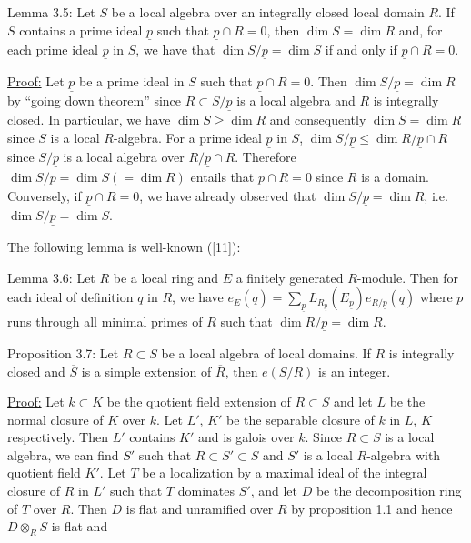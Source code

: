 Lemma 3.5: Let $S$ be a local algebra over an integrally closed local domain $R$. If $S$ contains a prime ideal $\underline p$ such that $\underline p\cap R=0$, then $\dim S=\dim R$ and, for each prime ideal $\underline p$ in $S$, we have that $\dim S/\underline p=\dim S$ if and only if $\underline p\cap R=0$.

\uline{Proof:} Let $\underline p$ be a prime ideal in $S$ such that $\underline p\cap R=0$. Then $\dim S/\underline p=\dim R$ by ``going down theorem'' since $R\subset S/\underline p$ is a local algebra and $R$ is integrally closed. In particular, we have $\dim S\geq\dim R$ and consequently $\dim S=\dim R$ since $S$ is a local $R$-algebra. For a prime ideal $\underline p$ in $S$, $\dim S/\underline p\leq\dim R/\underline p\cap R$ since $S/\underline p$ is a local algebra over $R/\underline p\cap R$. Therefore $\dim S/\underline p=\dim S(=\dim R)$ entails that $\underline p\cap R=0$ since $R$ is a domain. Conversely, if $\underline p\cap R=0$, we have already observed that $\dim S/\underline p=\dim R$, i.e. $\dim S/\underline p=\dim S$.
\margin{;}

The following lemma is well-known ([11]):

Lemma 3.6: Let $R$ be a local ring and $E$ a finitely generated $R$-module. Then for each ideal of definition $\underline q$ in $R$, we have $e_E(\underline q)=\sum_{\underline p}L_{R_{\underline p}}(E_{\underline p})e_{R/\underline p}(\underline q)$ where $\underline p$ runs through all minimal primes of $R$ such that $\dim R/\underline p=\dim R$.

Proposition 3.7: Let $R\subset S$ be a local algebra of local domains. If $R$ is integrally closed and $\overline S$ is a simple extension of $\overline R$, then $e(S/R)$ is an integer.

\uline{Proof:} Let $k\subset K$ be the quotient field extension of $R\subset S$ and let $L$ be the normal closure of $K$ over $k$. Let $L'$, $K'$ be the separable closure of $k$ in $L$, $K$ respectively. Then $L'$ contains $K'$ and is galois over $k$. Since $R\subset S$ is a local algebra, we can find $S'$ such that $R\subset S'\subset S$ and $S'$ is a local $R$-algebra with quotient field $K'$. Let $T$ be a localization by a maximal ideal of the integral closure of $R$ in $L'$ such that $T$ dominates $S'$, and let $D$ be the decomposition ring of $T$ over $R$. Then $D$ is flat and unramified over $R$ by proposition 1.1 and hence $D\otimes_R S$ is flat and
